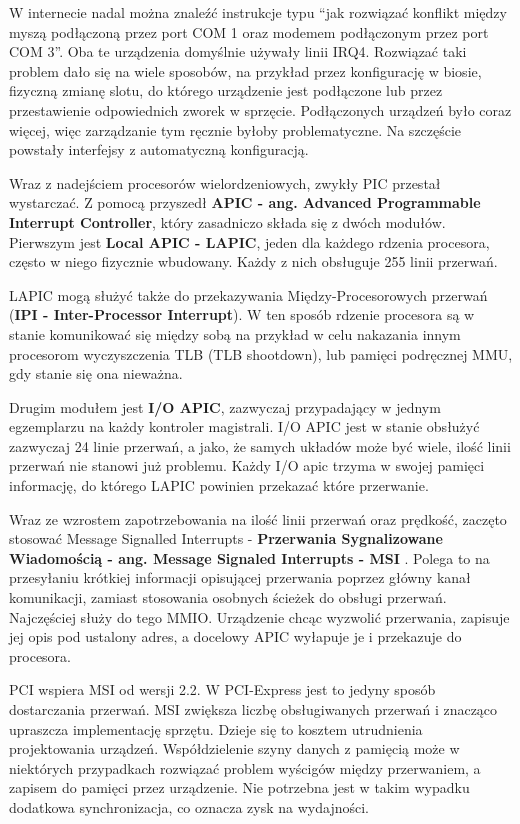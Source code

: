 \documentclass[shortabstract,inz]{iithesis}
\begin{document}
W internecie nadal można znaleźć instrukcje typu “jak rozwiązać konflikt między
myszą podłączoną przez port COM 1 oraz modemem podłączonym przez port COM 3”. Oba te
urządzenia domyślnie używały linii IRQ4. Rozwiązać taki problem dało się na
wiele sposobów, na przykład przez konfigurację w biosie, fizyczną zmianę slotu,
do którego urządzenie jest podłączone lub przez przestawienie odpowiednich
zworek w sprzęcie. Podłączonych urządzeń było coraz więcej, więc zarządzanie
tym ręcznie byłoby problematyczne. Na szczęście powstały interfejsy z
automatyczną konfiguracją. 


Wraz z nadejściem procesorów wielordzeniowych, zwykły PIC przestał wystarczać. 
Z pomocą przyszedł \textbf{APIC - ang. Advanced Programmable Interrupt 
Controller}, który zasadniczo składa się z dwóch modułów. Pierwszym jest \textbf{Local 
APIC - LAPIC}, jeden dla każdego rdzenia procesora, często w niego fizycznie 
wbudowany. Każdy z nich obsługuje 255 linii przerwań.  
 
LAPIC mogą służyć także do przekazywania Między-Procesorowych przerwań (\textbf{IPI - 
Inter-Processor Interrupt}). W ten sposób rdzenie procesora są w stanie  komunikować się między sobą na przykład w celu 
nakazania innym procesorom wyczyszczenia TLB (TLB shootdown), lub pamięci podręcznej MMU, 
gdy stanie się ona nieważna.
 
Drugim modułem jest \textbf{I/O APIC}, zazwyczaj przypadający w jednym egzemplarzu na 
każdy kontroler magistrali. I/O APIC jest w stanie 
obsłużyć zazwyczaj 24 linie przerwań, a jako, że samych układów może być wiele, 
ilość linii przerwań nie stanowi już problemu. Każdy I/O apic trzyma w swojej 
pamięci informację, do którego LAPIC powinien przekazać które przerwanie. 

Wraz ze wzrostem zapotrzebowania na ilość linii przerwań oraz prędkość,  zaczęto
stosować Message Signalled Interrupts - \textbf{Przerwania Sygnalizowane Wiadomością - ang. Message Signaled Interrupts 
- MSI} \cite{def:msi}. Polega to na przesyłaniu krótkiej informacji opisującej przerwania poprzez główny
kanał komunikacji, zamiast stosowania osobnych ścieżek do obsługi przerwań. 
Najczęściej służy do tego MMIO.  Urządzenie chcąc wyzwolić przerwania, zapisuje 
jej opis pod ustalony adres, a docelowy APIC wyłapuje je i przekazuje do procesora.

PCI wspiera MSI od wersji 2.2. W PCI-Express jest to jedyny sposób dostarczania przerwań. 
MSI zwiększa liczbę obsługiwanych przerwań i znacząco upraszcza implementację sprzętu.
Dzieje się to kosztem utrudnienia projektowania urządzeń.  Współdzielenie szyny danych
z pamięcią może w niektórych przypadkach rozwiązać problem wyścigów między przerwaniem, a zapisem do pamięci
przez urządzenie. Nie potrzebna jest w takim wypadku dodatkowa synchronizacja, co oznacza
zysk na wydajności. 
\end{document}
